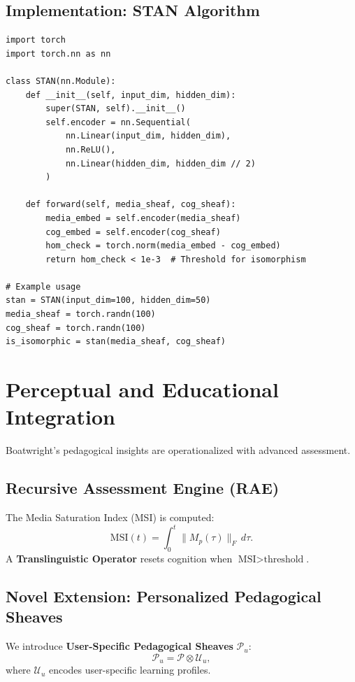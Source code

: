 \documentclass[12pt]{article}
\begin{document}
\subsection{Implementation: STAN Algorithm}
\begin{verbatim}
import torch
import torch.nn as nn

class STAN(nn.Module):
    def __init__(self, input_dim, hidden_dim):
        super(STAN, self).__init__()
        self.encoder = nn.Sequential(
            nn.Linear(input_dim, hidden_dim),
            nn.ReLU(),
            nn.Linear(hidden_dim, hidden_dim // 2)
        )
    
    def forward(self, media_sheaf, cog_sheaf):
        media_embed = self.encoder(media_sheaf)
        cog_embed = self.encoder(cog_sheaf)
        hom_check = torch.norm(media_embed - cog_embed)
        return hom_check < 1e-3  # Threshold for isomorphism

# Example usage
stan = STAN(input_dim=100, hidden_dim=50)
media_sheaf = torch.randn(100)
cog_sheaf = torch.randn(100)
is_isomorphic = stan(media_sheaf, cog_sheaf)
\end{verbatim}

\section{Perceptual and Educational Integration}
Boatwright’s pedagogical insights are operationalized with advanced assessment.

\subsection{Recursive Assessment Engine (RAE)}
The Media Saturation Index (MSI) is computed:
\[
\text{MSI}(t) = \int_0^t \| M_p(\tau) \|_F \, d\tau.
\]
A \textbf{Translinguistic Operator} resets cognition when $\text{MSI} > \text{threshold}$.

\subsection{Novel Extension: Personalized Pedagogical Sheaves}
We introduce \textbf{User-Specific Pedagogical Sheaves} $\mathcal{P}_u$:
\[
\mathcal{P}_u = \mathcal{P} \otimes \mathcal{U}_u,
\]
where $\mathcal{U}_u$ encodes user-specific learning profiles.
\end{document}
